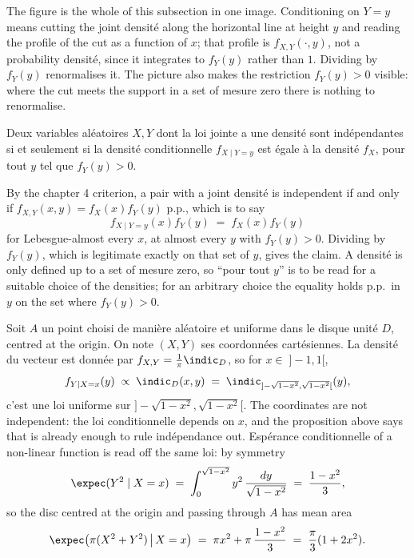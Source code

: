The figure is the whole of this subsection in one image. Conditioning on
$Y = y$ means cutting the joint densité along the horizontal line at height $y$
and reading the profile of the cut as a function of $x$; that profile is
$f_{X,Y}(\cdot,y)$, not a probability densité, since it integrates to $f_{Y}(y)$
rather than $1$. Dividing by $f_{Y}(y)$ renormalises it. The picture also makes
the restriction $f_{Y}(y) > 0$ visible: where the cut meets the support in a set
of mesure zero there is nothing to renormalise.

\begin{prop}
  Deux variables aléatoires $X, Y$ dont la loi jointe a une densité sont
  indépendantes si et seulement si la densité conditionnelle $f_{X \mid Y = y}$ est
  égale à la densité $f_{X}$, pour tout $y$ tel que $f_{Y}(y) > 0$.
\end{prop}

By the chapter 4 criterion, a pair with a joint densité is independent if and
only if $f_{X,Y}(x,y) = f_{X}(x) f_{Y}(y)$ p.p., which is to say
\[
  f_{X \mid Y = y}(x) f_{Y}(y) \;=\; f_{X}(x) f_{Y}(y)
\]
for Lebesgue-almost every $x$, at almost every $y$ with $f_{Y}(y) > 0$. Dividing by
$f_{Y}(y)$, which is legitimate exactly on that set of $y$, gives the claim.
A densité is only defined up to a set of mesure zero, so ``pour tout $y$'' is
to be read for a suitable choice of the densities; for an arbitrary choice the
equality holds p.p.\ in $y$ on the set where $f_{Y}(y) > 0$.

\begin{example}
  Soit $A$ un point choisi de manière aléatoire et uniforme dans le disque unité
  $D$, centred at the origin. On note $(X,Y)$ ses coordonnées cartésiennes. La
  densité du vecteur est donnée par $f_{X,Y} = \tfrac{1}{\pi} \indic_{D}$, so for
  $x \in \;]-1,1[$,
  \[
    f_{Y \mid X = x}(y) \;\propto\; \indic_{D}(x,y)
    \;=\; \indic_{]-\sqrt{1-x^{2}}, \sqrt{1-x^{2}}[}(y) ,
  \]
  c'est une loi uniforme sur $]-\sqrt{1-x^{2}}, \sqrt{1-x^{2}}[$. The coordinates
  are not independent: the loi conditionnelle depends on $x$, and the proposition
  above says that is already enough to rule indépendance out. Espérance
  conditionnelle of a non-linear function is read off the same loi: by symmetry
  \[
    \expec(Y^{2} \mid X = x)
    \;=\; \int_{0}^{\sqrt{1-x^{2}}} y^{2} \, \frac{dy}{\sqrt{1-x^{2}}}
    \;=\; \frac{1-x^{2}}{3} ,
  \]
  so the disc centred at the origin and passing through $A$ has mean area
  \[
    \expec\big( \pi (X^{2} + Y^{2}) \,\big|\, X = x \big)
    \;=\; \pi x^{2} + \pi \, \frac{1-x^{2}}{3}
    \;=\; \frac{\pi}{3} (1 + 2x^{2}) .
  \]
\end{example}

